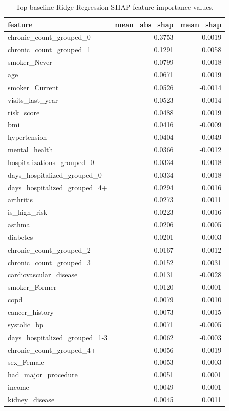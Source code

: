 \begin{table}
\caption{Top baseline Ridge Regression SHAP feature importance values.}
\label{tab:03-ridge-shap-importance}
\begin{tabular}{lrr}
\toprule
feature & mean_abs_shap & mean_shap \\
\midrule
chronic_count_grouped_0 & 0.3753 & 0.0019 \\
chronic_count_grouped_1 & 0.1291 & 0.0058 \\
smoker_Never & 0.0799 & -0.0018 \\
age & 0.0671 & 0.0019 \\
smoker_Current & 0.0526 & -0.0014 \\
visits_last_year & 0.0523 & -0.0014 \\
risk_score & 0.0488 & 0.0019 \\
bmi & 0.0416 & -0.0009 \\
hypertension & 0.0404 & -0.0049 \\
mental_health & 0.0366 & -0.0012 \\
hospitalizations_grouped_0 & 0.0334 & 0.0018 \\
days_hospitalized_grouped_0 & 0.0334 & 0.0018 \\
days_hospitalized_grouped_4+ & 0.0294 & 0.0016 \\
arthritis & 0.0273 & 0.0011 \\
is_high_risk & 0.0223 & -0.0016 \\
asthma & 0.0206 & 0.0005 \\
diabetes & 0.0201 & 0.0003 \\
chronic_count_grouped_2 & 0.0167 & 0.0012 \\
chronic_count_grouped_3 & 0.0152 & 0.0031 \\
cardiovascular_disease & 0.0131 & -0.0028 \\
smoker_Former & 0.0120 & 0.0001 \\
copd & 0.0079 & 0.0010 \\
cancer_history & 0.0073 & 0.0015 \\
systolic_bp & 0.0071 & -0.0005 \\
days_hospitalized_grouped_1-3 & 0.0062 & -0.0003 \\
chronic_count_grouped_4+ & 0.0056 & -0.0019 \\
sex_Female & 0.0053 & -0.0003 \\
had_major_procedure & 0.0051 & 0.0001 \\
income & 0.0049 & 0.0001 \\
kidney_disease & 0.0045 & 0.0011 \\
\bottomrule
\end{tabular}
\end{table}
